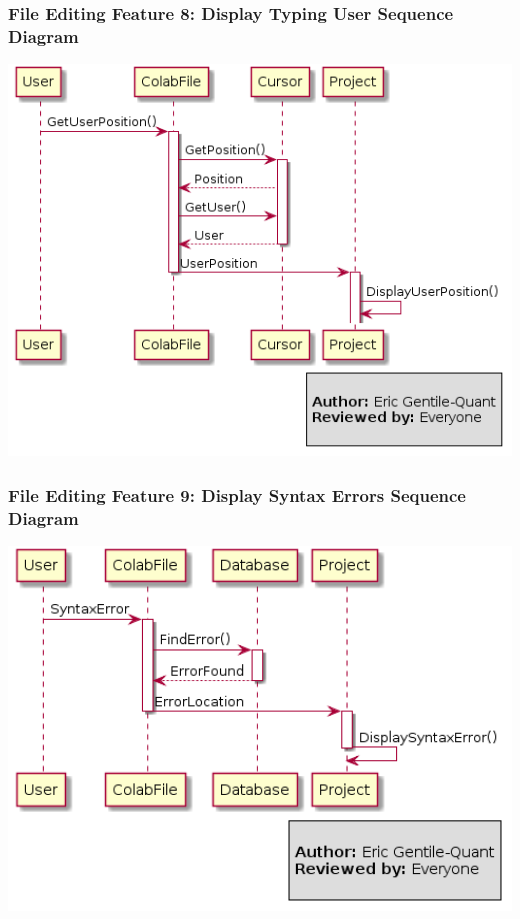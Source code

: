 \documentclass[twoside,letterpaper]{article}
\begin{document}
	\newpage
	
	\subsubsection[File Editing Feature 8: Display Typing User Sequence Diagram]{\rmfamily\bfseries\color{black}
		File Editing Feature 8: Display Typing User Sequence Diagram}
	\hypertarget{RefHeading22059017292}{}
	
	\bigskip
	
	\includegraphics[width=6.0in]{images/SequenceDiagrams/UserPosition}
	
	\newpage
	
	\subsubsection[File Editing Feature 9: Display Syntax Errors Sequence Diagram]{\rmfamily\bfseries\color{black}
		File Editing Feature 9: Display Syntax Errors Sequence Diagram}
	\hypertarget{RefHeading22059017292}{}
	
	\bigskip
	
	\includegraphics[width=6.0in]{images/SequenceDiagrams/SyntaxError}
	
\end{document}
